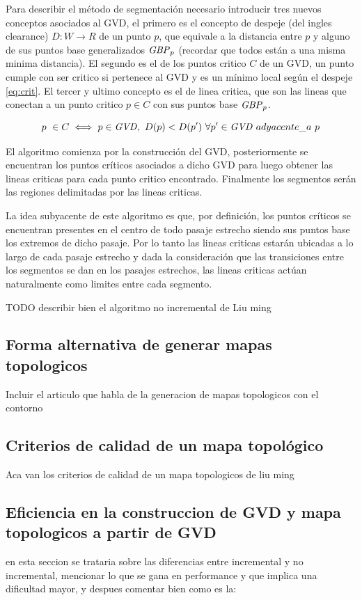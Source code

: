 Para describir el método de segmentación necesario introducir tres nuevos conceptos asociados al GVD, el primero es el concepto de despeje (del ingles clearance) $D : W \rightarrow R$ de un punto $p$, que equivale a la distancia entre $p$ y alguno de sus puntos base generalizados $\mathit{GBP}_p$ (recordar que todos están a una misma minima distancia). El segundo es el de los puntos critico $C$ de un GVD, un punto cumple con ser critico si pertenece al GVD y es un mínimo local según el despeje \ref{eq:crit}. El tercer y ultimo concepto es el de linea critica, que son las lineas que conectan a un punto critico $p \in C$ con sus puntos base $\mathit{GBP}_p$.

\begin{equation}
  p\ \in C \iff p \in \mathit{GVD},\ D(p) < D(p')\ \forall p' \in \mathit{GVD} \ adyacente\_a\ p \label{eq:crit}
\end{equation}

El algoritmo comienza por la construcción del GVD, posteriormente se encuentran los puntos críticos asociados a dicho GVD para luego obtener las lineas criticas para cada punto critico encontrado. Finalmente los segmentos serán las regiones delimitadas por las lineas criticas.

La idea subyacente de este algoritmo es que, por definición, los puntos críticos se encuentran presentes en el centro de todo pasaje estrecho siendo sus puntos base los extremos de dicho pasaje. Por lo tanto las lineas criticas estarán ubicadas a lo largo de cada pasaje estrecho y dada la consideración que las transiciones entre los segmentos se dan en los pasajes estrechos, las lineas criticas actúan naturalmente como limites entre cada segmento.

TODO describir bien el algoritmo no incremental de Liu ming

\subsection{Forma alternativa de generar mapas topologicos}
Incluir el articulo que habla de la generacion de mapas topologicos con el contorno 

\subsection{Criterios de calidad de un mapa topológico}
Aca van los criterios de calidad de un mapa topologicos de liu ming

\subsection{Eficiencia en la construccion de GVD y mapa topologicos a partir de GVD}
en esta seccion se trataria sobre las diferencias entre incremental y no incremental, mencionar lo que se gana en performance y que implica una dificultad mayor, y despues comentar bien como es la:


